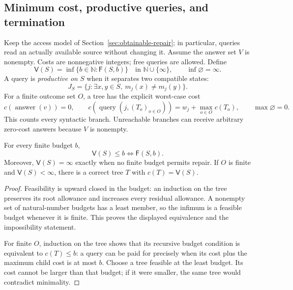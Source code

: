 \subsection{Minimum cost, productive queries, and termination}
\label{sec:optimal-repair}

Keep the access model of Section~\ref{sec:obtainable-repair}; in particular,
queries read an actually available source without changing it. Assume the
answer set $V$ is nonempty. Costs are nonnegative integers; free queries
are allowed. Define
\[
 \mathsf V(S)=\inf\{b\in\mathbb N:\mathsf F(S,b)\}
 \quad\text{in }\mathbb N\cup\{\infty\},
 \qquad \inf\varnothing=\infty.
\]
A query is \emph{productive on $S$} when it separates two compatible states:
\[
 J_S=\{j:\exists x,y\in S,\ m_j(x)\ne m_j(y)\}.
\]
For a finite outcome set $O$, a tree has the explicit worst-case cost
\[
 c(\operatorname{answer}(v))=0,\qquad
 c(\operatorname{query}(j,(T_o)_{o\in O}))
   =w_j+\max_{o\in O}c(T_o),
 \qquad \max\varnothing=0.
\]
This counts every syntactic branch. Unreachable branches can receive
arbitrary zero-cost answers because $V$ is nonempty.

\begin{theorem}\label{thm:minimum-repair}
For every finite budget $b$,
\[
 \mathsf V(S)\le b\iff\mathsf F(S,b).
\]
Moreover, $\mathsf V(S)=\infty$ exactly when no finite budget permits
repair. If $O$ is finite and $\mathsf V(S)<\infty$, there is a correct
tree $T$ with $c(T)=\mathsf V(S)$.
\end{theorem}
\begin{proof}
Feasibility is upward closed in the budget: an induction on the tree
preserves its root allowance and increases every residual allowance.
A nonempty set of natural-number budgets has a least member, so the
infimum is a feasible budget whenever it is finite. This proves the
displayed equivalence and the impossibility statement.

For finite $O$, induction on the tree shows that its recursive budget
condition is equivalent to $c(T)\le b$: a query can be paid for precisely
when its cost plus the maximum child cost is at most $b$. Choose a tree
feasible at the least budget. Its cost cannot be larger than that budget;
if it were smaller, the same tree would contradict minimality.
\end{proof}

